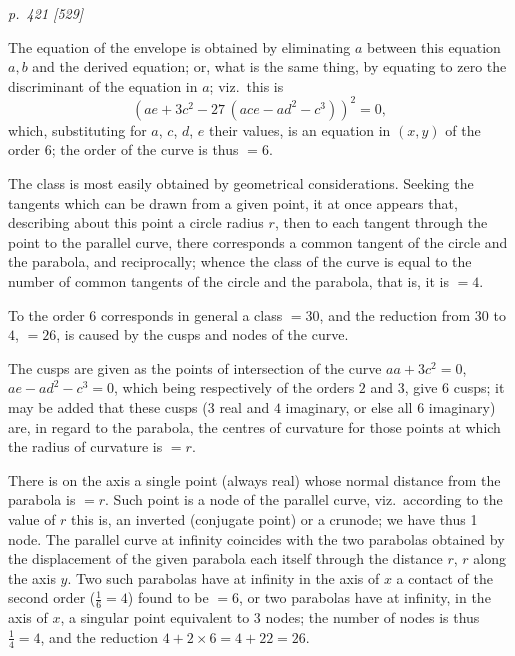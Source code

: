 \documentclass[11pt,a4paper]{article}
\theoremstyle{plain}
\theoremstyle{definition}
\begin{document}
\clearpage

\bigskip
\textit{p.~421 [529]}
\smallskip

The equation of the envelope is obtained by eliminating $a$ between this equation
$a, b$ and the derived equation; or, what is the same thing, by equating to zero the
discriminant of the equation in $a$; viz.\ this is
\[
(ae + 3c^2 - 27\,(ace - ad^2 - c^3))^2 = 0,
\]
which, substituting for $a$, $c$, $d$, $e$ their values, is an equation in $(x, y)$ of the order 6;
the order of the curve is thus $= 6$.

The class is most easily obtained by geometrical considerations. Seeking the
tangents which can be drawn from a given point, it at once appears that, describing
about this point a circle radius $r$, then to each tangent through the point to the
parallel curve, there corresponds a common tangent of the circle and the parabola, and
reciprocally; whence the class of the curve is equal to the number of common tangents
of the circle and the parabola, that is, it is $= 4$.

To the order 6 corresponds in general a class $= 30$, and the reduction from
$30$ to $4$, $= 26$, is caused by the cusps and nodes of the curve.

The cusps are given as the points of intersection of the curve $aa + 3c^2 = 0$,
$ae - ad^2 - c^3 = 0$, which being respectively of the orders $2$ and $3$, give $6$ cusps; it
may be added that these cusps ($3$ real and $4$ imaginary, or else all $6$ imaginary) are,
in regard to the parabola, the centres of curvature for those points at which the radius
of curvature is $= r$.

There is on the axis a single point (always real) whose normal distance from the
parabola is $= r$. Such point is a node of the parallel curve, viz.\ according to the
value of $r$ this is, an inverted (conjugate point) or a crunode; we have thus 1 node.
The parallel curve at infinity coincides with the two parabolas obtained by the displacement of the given parabola each itself through the distance $r$, $r$ along the axis $y$.  Two such parabolas have at infinity in the axis of $x$ a contact of the second order ($\frac{1}{6} = 4$) found to be $= 6$, or two parabolas have at infinity, in the axis of $x$, a singular point equivalent to $3$ nodes; the number of nodes is thus $\frac{1}{4} = 4$, and the reduction $4 + 2 \times 6 = 4 + 22 = 26$.
\end{document}
